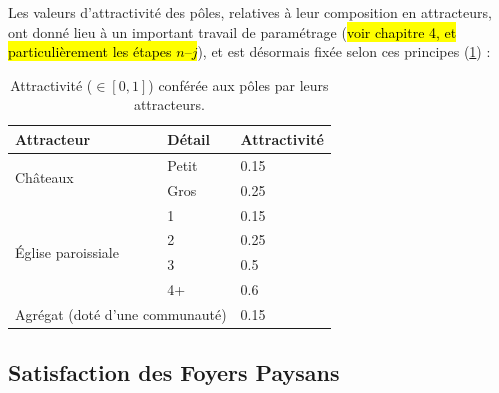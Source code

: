 Les valeurs d'attractivité des pôles, relatives à leur composition en attracteurs, ont donné lieu à un important travail de paramétrage (\hl{voir chapitre 4, et particulièrement les étapes $n$--$j$}), et est désormais fixée selon ces principes (\cref{tab:attraction-poles}) :

\begin{table}[H]
	\centering
	{\renewcommand{\arraystretch}{1.1}%
	\begin{tabular}{|l|l|l|}\hline
		\textbf{Attracteur} & \textbf{Détail} & \textbf{Attractivité} \\ \hline
		\multirow{2}{*}{Châteaux} & Petit & 0.15 \\
		& Gros & 0.25 \\ \hline
		\multirow{4}{*}{Église paroissiale} & 1 & 0.15 \\
		& 2 & 0.25 \\
		& 3 & 0.5 \\
		& 4+ & 0.6 \\ \hline
		\multicolumn{2}{|l|}{Agrégat (doté d'une communauté)} & 0.15 \\ \hline
	\end{tabular}}
	\caption{Attractivité ($\in [0,1]$) conférée aux pôles par leurs attracteurs.}
	\label{tab:attraction-poles}
\end{table}

\subsection{Satisfaction des Foyers Paysans}

